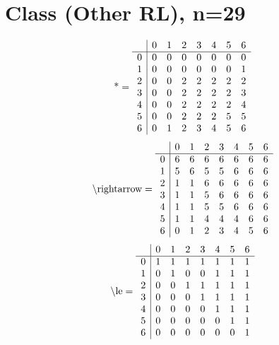 \documentclass[11pt]{article}
\begin{document}
\section{Class (Other RL), n=29}
\[\text{*} = 
\begin{array}{r | r r r r r r r}
 & 0 & 1 & 2 & 3 & 4 & 5 & 6 \\ \hline
0 & 0 & 0 & 0 & 0 & 0 & 0 & 0 \\
1 & 0 & 0 & 0 & 0 & 0 & 0 & 1 \\
2 & 0 & 0 & 2 & 2 & 2 & 2 & 2 \\
3 & 0 & 0 & 2 & 2 & 2 & 2 & 3 \\
4 & 0 & 0 & 2 & 2 & 2 & 2 & 4 \\
5 & 0 & 0 & 2 & 2 & 2 & 5 & 5 \\
6 & 0 & 1 & 2 & 3 & 4 & 5 & 6 \\
\end{array}
\]
\[\text{\textbackslash rightarrow} = 
\begin{array}{r | r r r r r r r}
 & 0 & 1 & 2 & 3 & 4 & 5 & 6 \\ \hline
0 & 6 & 6 & 6 & 6 & 6 & 6 & 6 \\
1 & 5 & 6 & 5 & 5 & 6 & 6 & 6 \\
2 & 1 & 1 & 6 & 6 & 6 & 6 & 6 \\
3 & 1 & 1 & 5 & 6 & 6 & 6 & 6 \\
4 & 1 & 1 & 5 & 5 & 6 & 6 & 6 \\
5 & 1 & 1 & 4 & 4 & 4 & 6 & 6 \\
6 & 0 & 1 & 2 & 3 & 4 & 5 & 6 \\
\end{array}
\]
\[\text{\textbackslash le} = 
\begin{array}{r | r r r r r r r}
 & 0 & 1 & 2 & 3 & 4 & 5 & 6 \\ \hline
0 & 1 & 1 & 1 & 1 & 1 & 1 & 1 \\
1 & 0 & 1 & 0 & 0 & 1 & 1 & 1 \\
2 & 0 & 0 & 1 & 1 & 1 & 1 & 1 \\
3 & 0 & 0 & 0 & 1 & 1 & 1 & 1 \\
4 & 0 & 0 & 0 & 0 & 1 & 1 & 1 \\
5 & 0 & 0 & 0 & 0 & 0 & 1 & 1 \\
6 & 0 & 0 & 0 & 0 & 0 & 0 & 1 \\
\end{array}
\]
\end{document}

